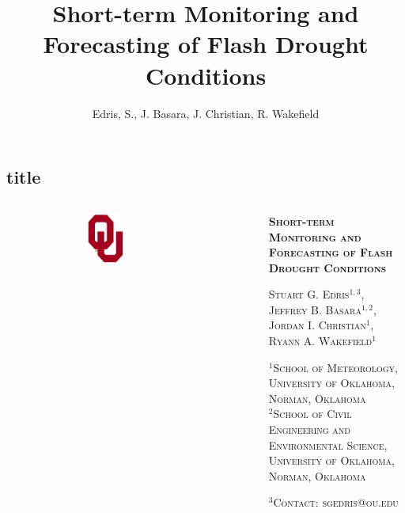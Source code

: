 \documentclass{beamer}
\title{Short-term Monitoring and Forecasting of Flash Drought Conditions}
\author{Edris, S., J. Basara, J. Christian, R. Wakefield}
\date{}
\begin{document}
	\begin{frame}[t]{}
		
		\section{title} %
		
		
		\begin{columns}
			~~~~~~ %
			\begin{figure}[htp]
				\includegraphics[width = 0.43\textwidth]{../Figures/Poster/ou_logo.png}
			\end{figure}
			
			
			~~~~~~ %
			\begin{creambox}
				\begin{block}{} %
					\centering
					\bf\textsc{\LARGE Short-term Monitoring and Forecasting of Flash Drought Conditions}\vspace{0.25em}
					\par
					\textsc{Stuart G. Edris$^{1,3}$, Jeffrey B. Basara$^{1,2}$, Jordan I. Christian$^1$, Ryann A. Wakefield$^1$}\vspace{0.25em}
					\par
					\textsc{${}^1$School of Meteorology, University of Oklahoma, Norman, Oklahoma \\ ${}^2$School of Civil Engineering and Environmental Science, University of Oklahoma, Norman, Oklahoma}\vspace{0.25em}
					\par
					\textsc{$^3$Contact: sgedris@ou.edu} %
				\end{block}	
			\end{creambox}
			

\end{columns}
\end{frame}
\end{document}
